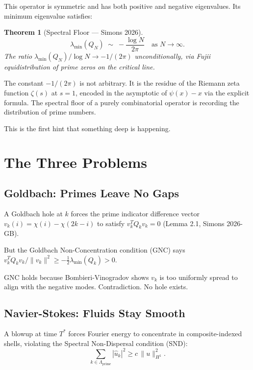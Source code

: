 \documentclass[11pt,reqno]{article}
\newtheorem{theorem}{Theorem}[section]
\begin{document}
This operator is symmetric and has both positive and negative eigenvalues.
Its minimum eigenvalue satisfies:

\begin{theorem}[Spectral Floor --- Simons 2026]\label{thm:floor}
\[
\lambda_{\min}(Q_N) \;\sim\; -\frac{\log N}{2\pi} \quad \text{as } N \to \infty.
\]
The ratio $\lambda_{\min}(Q_N)/\log N \to -1/(2\pi)$ unconditionally,
via Fujii equidistribution of prime zeros on the critical line.
\end{theorem}

The constant $-1/(2\pi)$ is not arbitrary.
It is the residue of the Riemann zeta function $\zeta(s)$ at $s=1$,
encoded in the asymptotic of $\psi(x) - x$ via the explicit formula.
The spectral floor of a purely combinatorial operator
is recording the distribution of prime numbers.

This is the first hint that something deep is happening.

\section{The Three Problems}

\subsection{Goldbach: Primes Leave No Gaps}

A Goldbach hole at $k$ forces the prime indicator difference vector
$v_k(i) = \chi(i) - \chi(2k-i)$ to satisfy $v_k^T Q_k v_k = 0$
(Lemma 2.1, Simons 2026-GB).

But the Goldbach Non-Concentration condition (GNC) says
$v_k^T Q_k v_k / \|v_k\|^2 \geq -\frac{1}{2}\lambda_{\min}(Q_k) > 0$.

GNC holds because Bombieri-Vinogradov shows $v_k$ is too uniformly spread
to align with the negative modes. Contradiction. No hole exists.

\subsection{Navier-Stokes: Fluids Stay Smooth}

A blowup at time $T^*$ forces Fourier energy to concentrate in
composite-indexed shells, violating the Spectral Non-Dispersal condition (SND):
\[
\sum_{k \in \Lambda_{\text{prime}}} |\hat{u}_k|^2 \geq c\,\|u\|_{H^1}^2.
\]
\end{document}
